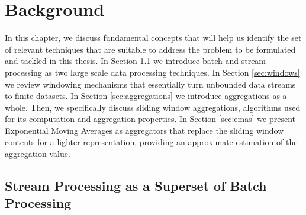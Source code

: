 \chapter{Background}\label{chap:background} \minitoc

In this chapter, we discuss fundamental concepts that will help us identify the set of relevant techniques that are suitable to address the problem to be formulated and tackled in this thesis. In Section \ref{sec:stream-superset} we introduce batch and stream processing as two large scale data processing techniques. In Section \ref{sec:windows} we review windowing mechanisms that essentially turn unbounded data streams to finite datasets. In Section \ref{sec:aggregations} we introduce aggregations as a whole. Then, we specifically discuss sliding window aggregations, algorithms used for its computation and aggregation properties. In Section \ref{sec:emas} we present Exponential Moving Averages as aggregators that replace the sliding window contents for a lighter representation, providing an approximate estimation of the aggregation value.

\section{Stream Processing as a Superset of Batch Processing} \label{sec:stream-superset}

